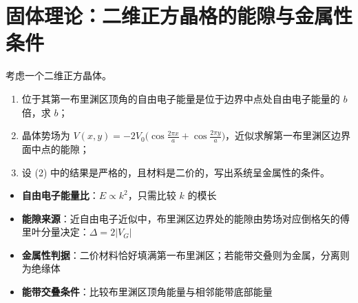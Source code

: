 \section{固体理论：二维正方晶格的能隙与金属性条件}
\label{sec:2d-square-gap}

\begin{modelbox}
考虑一个二维正方晶体。
\begin{enumerate}
    \item 位于其第一布里渊区顶角的自由电子能量是位于边界中点处自由电子能量的 $b$ 倍，求 $b$；
    \item 晶体势场为 $V(x,y)=-2V_0\bigl(\cos\frac{2\pi x}{a}+\cos\frac{2\pi y}{a}\bigr)$，近似求解第一布里渊区边界面中点的能隙；
    \item 设 (2) 中的结果是严格的，且材料是二价的，写出系统呈金属性的条件。
\end{enumerate}
\end{modelbox}

\begin{tipbox}[考点快速分析]
\begin{itemize}
    \item \textbf{自由电子能量比}：$E\propto k^2$，只需比较 $k$ 的模长
    \item \textbf{能隙来源}：近自由电子近似中，布里渊区边界处的能隙由势场对应倒格矢的傅里叶分量决定：$\Delta = 2|V_G|$
    \item \textbf{金属性判据}：二价材料恰好填满第一布里渊区；若能带交叠则为金属，分离则为绝缘体
    \item \textbf{能带交叠条件}：比较布里渊区顶角能量与相邻能带底部能量
\end{itemize}
\end{tipbox}

